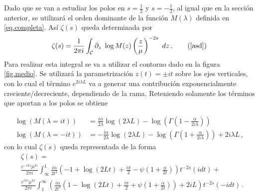 Dado que se van a estudiar los polos en $s= \frac{1}{2}$ y $s=- \frac{1}{2}$, al igual que en la sección anterior, se utilizará el orden dominante de la función $M ( \lambda )$ definida en \eqref{eq.completa}. Así
$ \zeta (s)$ queda determinada por
\begin{equation}
\zeta (s) = 
\frac{1}{2 \pi i} 
\int _{\mathcal{C}}
\partial _z \ \log 	M(z)  \left( \frac{z}{\mu} \right) ^{-2s} \ dz
	\, ,
	\tag{\ref{asd}}
\end{equation}
Para realizar esta integral se va a utilizar el contorno dado en la figura \ref{fig.medio}. Se utilizará la parametrización $ z (t) = \pm i t$ sobre los ejes verticales, con lo cual el término $e ^{2 i \lambda L}$ va a generar una contribución exponencialmente creciente/decreciente, dependiendo de la rama. Reteniendo solamente los términos que aportan a los polos se obtiene
\begin{comment}
\begin{equation}
\begin{array}{c}
    \zeta  (s) = \\
     \frac{1}{2 \pi i} \int _{\infty} ^{1}
     \frac{ i \alpha }{2 t^2} 
     \left(
      1 + \frac{i \pi}{2} + Ln[2 t] + \psi (1 + \frac{\beta}{2 t})
     \right)
     t ^{-2s}
     e ^{- i \pi s} (i dt) + \\
     \frac{1}{2 \pi i} \int _{\infty} ^{1} 
     \left(
     2 + \frac{\beta}{2 t^2}
     \left(
     1 + \frac{i \pi}{2} - Ln[2 t] - \psi (1+ \frac{\beta}{2 t})
     \right)
     t ^{-2s}
     e ^{ i \pi s} (-i dt)
     \right)     
\end{array}
\end{equation}
\end{comment}
\begin{align}\label{eq.logatirmos}
\log ( M ( \lambda = i t ) ) &=   
\frac{i \alpha }{2 \lambda}  \log (2 \lambda L) - 
 \log \left( \Gamma \left( 1 - \frac{ \alpha}{2 i \lambda} \right) \right) \\ 
\log ( M ( \lambda=-i t ) ) &=   -  
\frac{i \alpha }{2 \lambda}  \log ( 2 \lambda L ) - 
 \log \left( \Gamma \left( 1 + \frac{ \alpha}{2 i \lambda} \right) \right) +
2 i \lambda L  \nonumber
	\,	,
\end{align}
con lo cual $\zeta (s)$ queda representada de la forma
\begin{align}\label{eq.zeta.logs}
     & \zeta  (s) = \\
     & \frac{e^{-i \pi s} \mu ^{2s}}{2 \pi i} \int _{\infty} ^{1}
     \frac{ i \alpha}{2 t^2}
     \left(
     - 1 +  \log (2 L t) + \frac{i \pi}{2}  - \psi \left( 1+\frac{\alpha}{2 t} \right)
     \right)
     t^{-2 s}
      \nonumber
     (i dt) + \\
     & \frac{e^{i \pi s} \mu ^{2s}}{2 \pi i} \int _1 ^{\infty}
	\left(      
     \frac{ i \alpha}{2  t^2}
     \left(
     1 -  \log (2 L t) + \frac{i \pi}{2} + \psi \left( 1 + \frac{\alpha}{2 t} \right)       
     \right)
     + 2 i L
     \right)
     t^{-2 s}
     (-i dt) \nonumber
     	\, .
\end{align}
